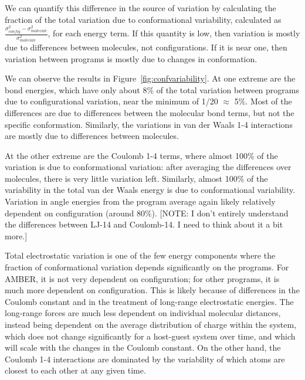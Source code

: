 We can quantify this difference in the source of variation by
calculating the fraction of the total variation due to conformational
variability, calculated as
$\frac{\sigma^2_{config}-\sigma^2_{molecule}}{\sigma^2_{molecule}}$,
for each energy term. If this quantity is low, then variation is
mostly due to differences between molecules, not configurations.  If
it is near one, then variation between programs is mostly due to
changes in conformation.

We can observe the results in Figure~\ref{fig:confvariability}. At one
extreme are the bond energies, which have only about 8\% of the total
variation between programs due to configurational variation, near the
minimum of 1/20 $\approx$ 5\%. Most of the differences are due to
differences between the molecular bond terms, but not the specific
conformation.  Similarly, the variations in van der Waals 1-4
interactions are mostly due to differences between molecules.

At the other extreme are the Coulomb 1-4 terms, where almost 100\% of
the variation is due to conformational variation: after averaging the
differences over molecules, there is very little variation left.
Similarly, almost 100\% of the variability in the total van der Waals
energy is due to conformational variability.  Variation in angle
energies from the program average again likely relatively dependent on
configuration (around 80\%). [NOTE: I don't entirely understand the
  differences between LJ-14 and Coulomb-14.  I need to think about it
  a bit more.]

Total electrostatic variation is one of the few energy components
where the fraction of conformational variation depends significantly
on the programs.  For AMBER, it is not very dependent on
configuration; for other programs, it is much more dependent on
configuration. This is likely because of differences in the Coulomb
constant and in the treatment of long-range electrostatic
energies.
 The long-range forces are much less dependent on individual
molecular distances, instead being dependent on the average
distribution of charge within the system, which does not change
significantly for a host-guest system over time, and which will scale
with the changes in the Coulomb constant.  On the other hand, the
Coulomb 1-4 interactions are dominated by the variability of which
atoms are closest to each other at any given time.

